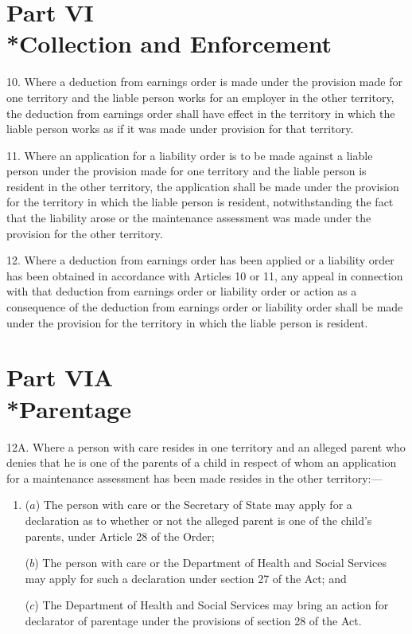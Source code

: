 \documentclass[a4paper]{article}
\newcommand{\parthead}{}
\begin{document}
\section[Part VI --- Collection and Enforcement]{Part VI\\*Collection and Enforcement}

\renewcommand\parthead{--- Schedule 1 Part VI}

10.   Where a deduction from earnings order is made under the provision made for one territory and the liable person works for an employer in the other territory, the deduction from earnings order shall have effect in the territory in which the liable person works as if it was made under provision for that territory.

\medskip

11.   Where an application for a liability order is to be made against a liable person under the provision made for one territory and the liable person is resident in the other territory, the application shall be made under the provision for the territory in which the liable person is resident, notwithstanding the fact that the liability arose or the maintenance assessment was made under the provision for the other territory.

\medskip

12.   Where a deduction from earnings order has been applied or a liability order has been obtained in accordance with Articles 10 or 11, any appeal in connection with that deduction from earnings order or liability order or action as a consequence of the deduction from earnings order or liability order shall be made under the provision for the territory in which the liable person is resident.

\section[Part VIA --- Parentage]{Part VIA\\*Parentage}

\renewcommand\parthead{--- Schedule 1 Part VIA}

12A.  Where a person with care resides in one territory and an alleged parent who denies that he is one of the parents of a child in respect of whom an application for a maintenance assessment has been made resides in the other territory:—
\begin{enumerate}\item[]
($a$) The person with care or the Secretary of State may apply for a declaration as to whether or not the alleged parent is one of the child’s parents, under Article 28 of the Order;

($b$) The person with care or the Department of Health and Social Services may apply for such a declaration under section 27 of the Act; and

($c$) The Department of Health and Social Services may bring an action for declarator of parentage under the provisions of section 28 of the Act.
\end{enumerate}
\end{document}
